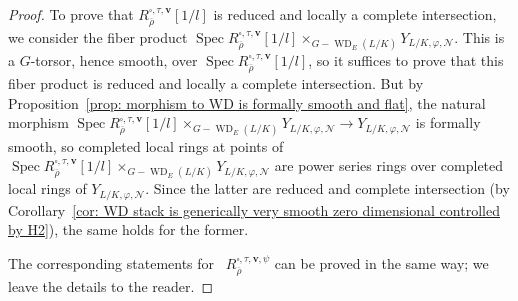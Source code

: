 \documentclass{amsart}
\DeclareMathOperator{\Lie}{Lie}
\def\ad{\mathrm{ad}}
\theoremstyle{definition}
\theoremstyle{remark}
\newcommand{\mar}[1]{}
\newcommand{\mar}[1]{\marginpar{\raggedright\tiny squirrel #1}}
\DeclareMathOperator{\Fil}{Fil}
\DeclareMathOperator{\Gal}{Gal}
\DeclareMathOperator{\Spec}{Spec}
\DeclareMathOperator{\Spf}{Spf}
\DeclareMathOperator{\WD}{WD}
\newcommand{\st}{\mathrm{st}}
\newcommand{\rhobar}{\overline{\rho}}
\newcommand{\Res}{\operatorname{Res}}
\begin{document}
\begin{proof}
To prove that $R_{\rhobar}^{\square,\tau,\mathbf{v}}[1/l]$ is reduced and locally a complete intersection, we consider the fiber product $\Spec R_{\rhobar}^{\square,\tau,\mathbf{v}}[1/l]\times_{G-\WD_E(L/K)}Y_{L/K,\varphi,\mathcal N}$.  This is a $G$-torsor, hence smooth, over $\Spec R_{\rhobar}^{\square,\tau,\mathbf{v}}[1/l]$, so it suffices to prove that this fiber product is reduced and locally a complete intersection.  But by Proposition~\ref{prop: morphism to WD is formally smooth and flat}, the natural morphism $\Spec R_{\rhobar}^{\square,\tau,\mathbf{v}}[1/l]\times_{G-\WD_E(L/K)}Y_{L/K,\varphi,\mathcal N}\rightarrow Y_{L/K,\varphi,\mathcal N}$ is formally smooth, so completed local rings at points of $\Spec R_{\rhobar}^{\square,\tau,\mathbf{v}}[1/l]\times_{G-\WD_E(L/K)}Y_{L/K,\varphi,\mathcal N}$ are power series rings over completed local rings of $Y_{L/K,\varphi,\mathcal N}$.  Since the latter are reduced and complete intersection (by Corollary~\ref{cor: WD stack is generically very smooth zero dimensional controlled by H2}), the same holds for the former.

The corresponding statements for~
$R_{\rhobar}^{\square,\tau,\mathbf{v},\psi}$ can be proved in the same
way; we leave the details to the reader.%
\end{proof}
\end{document}
